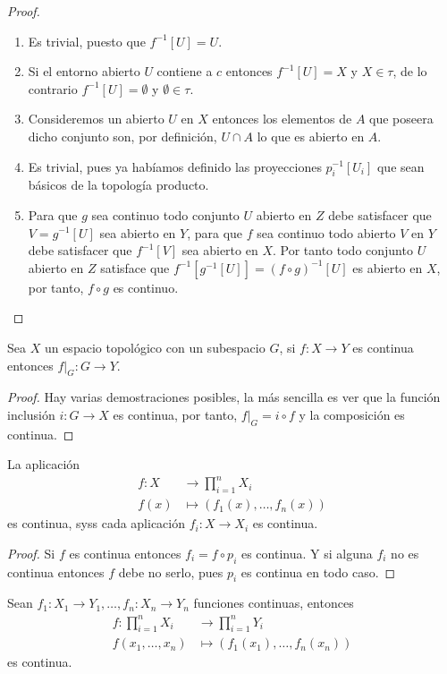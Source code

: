 \documentclass[11pt,oneside,a4paper]{book}
\begin{document}
\begin{proof}
\begin{enumerate}[1)]
\item Es trivial, puesto que $f^{-1}[U]=U$.
\item Si el entorno abierto $U$ contiene a $c$ entonces $f^{-1}[U]=X$ y $X\in\tau$, de lo contrario $f^{-1}[U]=\emptyset$ y $\emptyset\in\tau$.
\item Consideremos un abierto $U$ en $X$ entonces los elementos de $A$ que poseera dicho conjunto son, por definición, $U\cap A$ lo que es abierto en $A$.
\item Es trivial, pues ya habíamos definido las proyecciones $p_i^{-1}[U_i]$ que sean básicos de la topología producto.
\item Para que $g$ sea continuo todo conjunto $U$ abierto en $Z$ debe satisfacer que $V=g^{-1}[U]$ sea abierto en $Y$, para que $f$ sea continuo todo abierto $V$ en $Y$ debe satisfacer que $f^{-1}[V]$ sea abierto en $X$. Por tanto todo conjunto $U$ abierto en $Z$ satisface que $f^{-1}[g^{-1}[U]]=(f\circ g)^{-1}[U]$ es abierto en $X$, por tanto, $f\circ g$ es continuo.
\end{enumerate}
\end{proof}
\begin{cor}
Sea $X$ un espacio topológico con un subespacio $G$, si $f:X\rightarrow Y$ es continua entonces $f|_G:G\rightarrow Y$.
\end{cor}
\begin{proof}
Hay varias demostraciones posibles, la más sencilla es ver que la función inclusión $i:G\rightarrow X$ es continua, por tanto, $f|_G=i\circ f$ y la composición es continua.
\end{proof}
\begin{cor}
La aplicación
\begin{align*}
f:X&\longrightarrow\prod_{i=1}^n X_i\\
f(x)&\longmapsto(f_1(x),\dots,f_n(x))
\end{align*}
es continua, syss cada aplicación $f_i:X\rightarrow X_i$ es continua.
\end{cor}
\begin{proof}
Si $f$ es continua entonces $f_i=f\circ p_i$ es continua. Y si alguna $f_i$ no es continua entonces $f$ debe no serlo, pues $p_i$ es continua en todo caso.
\end{proof}
\begin{cor}
Sean $f_1:X_1\rightarrow Y_1,\dots,f_n:X_n\rightarrow Y_n$ funciones continuas, entonces
\begin{align*}
f:\prod_{i=1}^n X_i&\longrightarrow\prod_{i=1}^n Y_i\\
f(x_1,\dots,x_n)&\longmapsto(f_1(x_1),\dots,f_n(x_n))
\end{align*}
es continua.
\end{cor}
\end{document}
